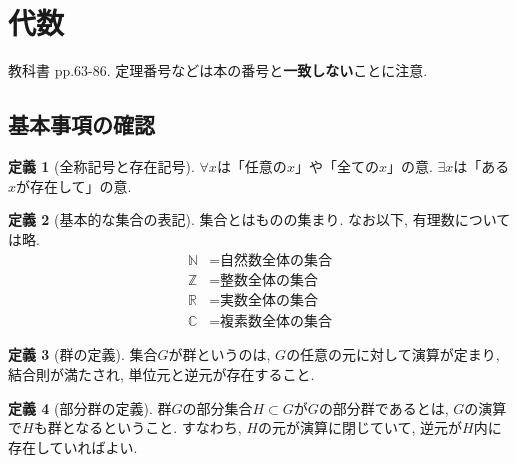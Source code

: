 \documentclass[a4j,dvipdfmx]{jsarticle}
\theoremstyle{definition}
\newtheorem{definition}{定義}
\theoremstyle{definition}
\theoremstyle{definition}
\begin{document}
    \section*{代数}
        教科書 pp.63-86. 定理番号などは本の番号と\textbf{一致しない}ことに注意.
        \subsection*{基本事項の確認}
            \begin{definition}[全称記号と存在記号]
                $\forall x$は「任意の$x$」や「全ての$x$」の意. $\exists x$は「ある$x$が存在して」の意.
            \end{definition}
            \begin{definition}[基本的な集合の表記]集合とはものの集まり. なお以下, 有理数については略.
                \begin{align*}
                    \mathbb{N}&=\text{自然数全体の集合}\\
                    \mathbb{Z}&=\text{整数全体の集合}\\
                    \mathbb{R}&=\text{実数全体の集合}\\
                    \mathbb{C}&=\text{複素数全体の集合}
                \end{align*}
            \end{definition}

            \begin{definition}[群の定義]
                集合$G$が群というのは, $G$の任意の元に対して演算が定まり, 結合則が満たされ, 単位元と逆元が存在すること.
            \end{definition}

            \begin{definition}[部分群の定義]
                群$G$の部分集合$H\subset G$が$G$の部分群であるとは, $G$の演算で$H$も群となるということ. すなわち, $H$の元が演算に閉じていて, 逆元が$H$内に存在していればよい. 
            \end{definition}
\end{document}
